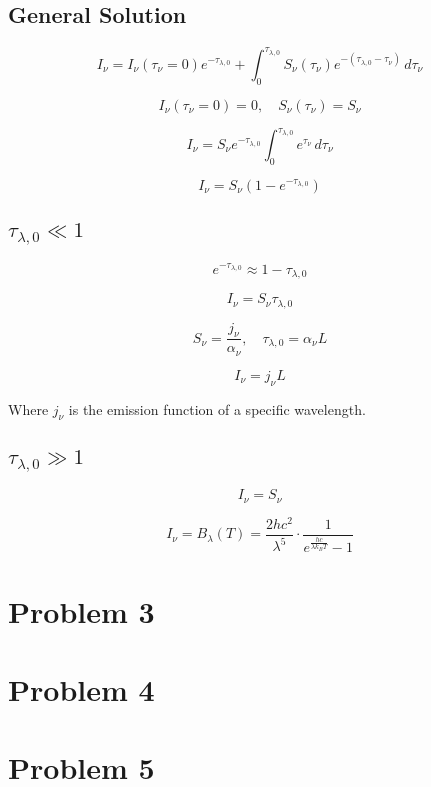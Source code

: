\documentclass[12pt]{article}
\begin{document}
\subsection{General Solution}



\[
    I_\nu = I_\nu(\tau_\nu=0) e^{-\tau_{\lambda,0}} + \int_{0}^{\tau_{\lambda,0}} S_\nu(\tau_\nu) e^{-(\tau_{\lambda,0} - \tau_\nu)} \, d\tau_\nu
\]

\[
    I_\nu(\tau_\nu=0) = 0,\quad S_\nu(\tau_\nu) = S_\nu
\]

\[
    I_\nu = S_\nu e^{-\tau_{\lambda,0}} \int_{0}^{\tau_{\lambda,0}} e^{\tau_\nu} \, d\tau_\nu
\]

\[
    I_\nu = S_\nu (1 - e^{-\tau_{\lambda,0}})
\]


\subsection{$\tau_{\lambda,0} \ll 1$}

\[
    e^{-\tau_{\lambda,0}} \approx 1 - \tau_{\lambda,0}
\]

\[
    I_\nu = S_\nu \tau_{\lambda,0}
\]

\[
    S_\nu = \frac{j_\nu}{\alpha_\nu},\quad \tau_{\lambda,0} = \alpha_\nu L
\]

\[
    I_\nu = j_\nu L
\]

Where $j_\nu$ is the emission function of a specific wavelength.

\subsection{$\tau_{\lambda,0} \gg 1$}

\[
    I_\nu = S_\nu
\]

\[
    I_\nu = B_\lambda(T) = \frac{2 h c^2}{\lambda^5} \cdot \frac{1}{e^{\frac{h c}{\lambda k_B T}} - 1}
\]

\newpage

\section{Problem 3}



\newpage

\section{Problem 4}



\newpage

\section{Problem 5}



\newpage



\nocite{El-Deeb_PEU-438_Assignments}
\end{document}
